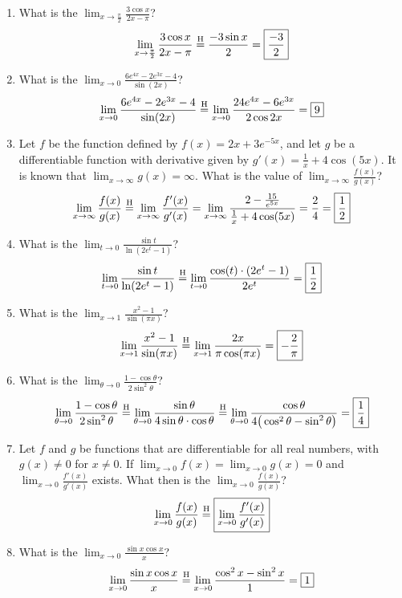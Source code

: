\documentclass[12pt]{article}
\begin{document}
\begin{enumerate}
    \item What is the $\lim_{x\to\frac{\pi}{2}}\frac{3\cos x}{2x-\pi}$?
$$\lim_{x\to\frac{\pi}{2}}\frac{3\cos x}{2x-\pi} \overset{\mathrm{H}}{=} \frac{-3\sin x}{2}=\boxed{\frac{-3}{2}}$$
    
    \item What is the $\lim_{x\to0}\frac{6e^{4x}-2e^{3x}-4}{\sin(2x)}$?
   $$\lim_{x\to0}\frac{6e^{4x}-2e^{3x}-4}{\sin(2x)} \overset{\mathrm{H}}{=} \lim_{x\to0} \frac{24e^{4x}-6e^{3x}}{2\cos 2x} =\boxed{9}$$
    \item Let $f$ be the function defined by $f(x)=2x+3e^{-5x}$, and let $g$ be a differentiable function with derivative given by $g'(x)=\frac{1}{x}+4\cos(5x)$. It is known that $\lim_{x\to\infty}g(x) =\infty$. What is the value of $\lim_{x\to\infty}\frac{f(x)}{g(x)}$?
$$\lim_{x\to\infty}\frac{f(x)}{g(x)} \overset{\mathrm{H}}{=} \lim_{x\to\infty}\frac{f'(x)}{g'(x)} = \lim_{x\to\infty} \frac{2-\frac{15}{e^{5x}}}{\frac{1}{x}+4\cos(5x)}= \frac{2}{4}=\boxed{\frac{1}{2}}$$
    
    \item What is the $\lim_{t\to0}\frac{\sin t}{\ln(2e^t-1)}$?
$$\lim_{t\to0}\frac{\sin t}{\ln(2e^t-1)} \overset{\mathrm{H}}{=} \lim_{t\to0} \frac{\cos (t) \cdot(2e^t-1)}{2e^t} =\boxed{\frac{1}{2}}$$
    
    \item What is the $\lim_{x\to1}\frac{x^2-1}{\sin(\pi x)}$?
   $$\lim_{x\to1}\frac{x^2-1}{\sin(\pi x)} \overset{\mathrm{H}}{=} \lim_{x\to1} \frac{2x}{\pi\cos(\pi x)} = \boxed{-\frac{2}{\pi}}$$
   
    \item What is the $\lim_{\theta\to0}\frac{1-\cos \theta}{2\sin^2 \theta}$?
$$\lim_{\theta\to0}\frac{1-\cos \theta}{2\sin^2 \theta}\overset{\mathrm{H}}{=} \lim_{\theta \to 0}\frac{\sin \theta}{4 \sin \theta \cdot \cos \theta} \overset{\mathrm{H}}{=} \lim_{\theta \to 0} \frac{\cos \theta}{4\big(\cos^2 \theta -\sin^2\theta\big)} =\boxed{\frac{1}{4}}$$
    
    \item Let $f$ and $g$ be functions that are differentiable for all real numbers, with $g(x)\neq 0$ for $x\neq0$. If $\lim_{x\to0}f(x)=\lim_{x\to0}g(x)=0$ and $\lim_{x\to0}\frac{f'(x)}{g'(x)}$ exists. What then is the $\lim_{x\to0}\frac{f(x)}{g(x)}$?
$$\lim_{x\to0}\frac{f(x)}{g(x)}  \overset{\mathrm{H}}{=} \boxed{\lim_{x\to0}\frac{f'(x)}{g'(x)}}$$
    
    \item What is the $\lim_{x\to 0} \frac{\sin x \cos x}{x}$?
$$\lim_{x\to 0} \frac{\sin x \cos x}{x} \overset{\mathrm{H}}{=} \lim_{x\to 0} \frac{\cos^2 x-\sin^2 x}{1} = \boxed{1}$$
    

\end{enumerate}
\end{document}
